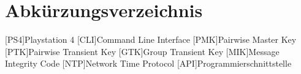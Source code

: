 \section*{Abkürzungsverzeichnis}
\begin{acronym}
    [PS4]{Playstation 4}
    [CLI]{Command Line Interface}
    [PMK]{Pairwise Master Key}
    [PTK]{Pairwise Transient Key}
    [GTK]{Group Transient Key}
    [MIK]{Message Integrity Code}
    [NTP]{Network Time Protocol}
    [API]{Programmierschnittstelle}
\end{acronym}